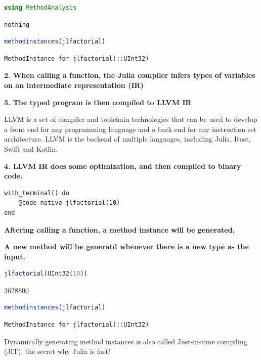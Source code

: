 \documentclass[
  notoc %
]{tufte-book}
\begin{document}
\begin{lstlisting}[language=Julia]
using MethodAnalysis
\end{lstlisting}

\begin{lstlisting}[language=Output]
nothing
\end{lstlisting}

\begin{lstlisting}[language=Julia]
methodinstances(jlfactorial)
\end{lstlisting}

\begin{lstlisting}[language=Output]
MethodInstance for jlfactorial(::UInt32)
\end{lstlisting}

\textbf{2. When calling a function, the Julia compiler infers types of
variables on an intermediate representation (IR)}

\textbf{3. The typed program is then compiled to LLVM IR}

LLVM is a set of compiler and toolchain technologies that can be used to
develop a front end for any programming language and a back end for any
instruction set architecture. LLVM is the backend of multiple languages,
including Julia, Rust, Swift and Kotlin.

\textbf{4. LLVM IR does some optimization, and then compiled to binary
code.}

\begin{lstlisting}
with_terminal() do
    @code_native jlfactorial(10)
end
\end{lstlisting}

\textbf{Aftering calling a function, a method instance will be
generated.}

\textbf{A new method will be generatd whenever there is a new type as
the input.}

\begin{lstlisting}[language=Julia]
jlfactorial(UInt32(10))
\end{lstlisting}

3628800

\begin{lstlisting}[language=Julia]
methodinstances(jlfactorial)
\end{lstlisting}

\begin{lstlisting}[language=Output]
MethodInstance for jlfactorial(::UInt32)
\end{lstlisting}

Dynamically generating method instances is also called Just-in-time
compiling (JIT), the secret why Julia is fast!
\end{document}
